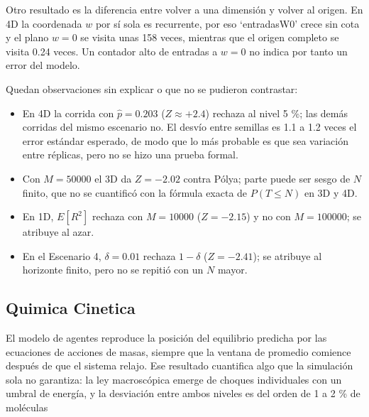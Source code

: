 \documentclass{article}
\begin{document}
Otro resultado es la diferencia entre volver a una dimensión y volver al origen. En 4D la coordenada $w$ por sí sola es recurrente, por eso `entradasW0' crece sin cota y el plano $w=0$ se visita unas 158 veces, mientras que el origen completo se visita 0.24 veces. Un contador alto de entradas a $w=0$ no indica por tanto un error del modelo.

Quedan observaciones sin explicar o que no se pudieron contrastar:
\begin{itemize}
    \item En 4D la corrida con $\hat p=0.203$ ($Z\approx+2.4$) rechaza al nivel 5 \%; las demás corridas del mismo escenario no. El desvío entre semillas es 1.1 a 1.2 veces el error estándar esperado, de modo que lo más probable es que sea variación entre réplicas, pero no se hizo una prueba formal.
    \item Con $M=50000$ el 3D da $Z=-2.02$ contra Pólya; parte puede ser sesgo de $N$ finito, que no se cuantificó con la fórmula exacta de $P(T\leq N)$ en 3D y 4D.
    \item En 1D, $E[R^2]$ rechaza con $M=10000$ ($Z=-2.15$) y no con $M=100000$; se atribuye al azar.
    \item En el Escenario 4, $\delta=0.01$ rechaza $1-\delta$ ($Z=-2.41$); se atribuye al horizonte finito, pero no se repitió con un $N$ mayor.
\end{itemize}

\subsection{Quimica Cinetica}
El modelo de agentes reproduce la posición del equilibrio predicha por las ecuaciones de acciones de masas, siempre que la ventana de promedio comience después de que el sistema relajo. Ese resultado cuantifica algo que la simulación sola no garantiza: la ley macroscópica emerge de choques individuales con un umbral de energía, y la desviación entre ambos niveles es del orden de 1 a 2 \%  de moléculas
\end{document}
